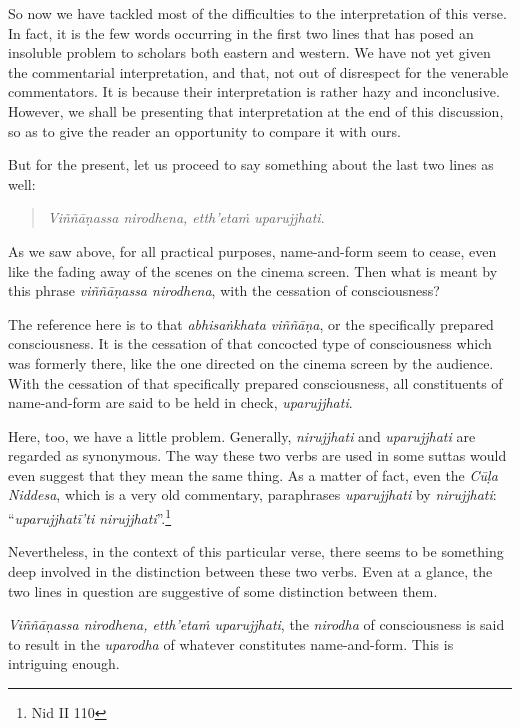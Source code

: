 So now we have tackled most of the difficulties to the interpretation of this verse. In fact, it is the few words occurring in the first two lines that has posed an insoluble problem to scholars both eastern and western. We have not yet given the commentarial interpretation, and that, not out of disrespect for the venerable commentators. It is because their interpretation is rather hazy and inconclusive. However, we shall be presenting that interpretation at the end of this discussion, so as to give the reader an opportunity to compare it with ours.

But for the present, let us proceed to say something about the last two lines as well:

\begin{quote}
\emph{Viññāṇassa nirodhena, etth'etaṁ uparujjhati}.
\end{quote}

As we saw above, for all practical purposes, name-and-form seem to cease, even like the fading away of the scenes on the cinema screen. Then what is meant by this phrase \emph{viññāṇassa nirodhena}, with the cessation of consciousness?

The reference here is to that \emph{abhisaṅkhata viññāṇa}, or the specifically prepared consciousness. It is the cessation of that concocted type of consciousness which was formerly there, like the one directed on the cinema screen by the audience. With the cessation of that specifically prepared consciousness, all constituents of name-and-form are said to be held in check, \emph{uparujjhati}.

Here, too, we have a little problem. Generally, \emph{nirujjhati} and \emph{uparujjhati} are regarded as synonymous. The way these two verbs are used in some suttas would even suggest that they mean the same thing. As a matter of fact, even the \emph{Cūḷa Niddesa}, which is a very old commentary, paraphrases \emph{uparujjhati} by \emph{nirujjhati}: ``\emph{uparujjhatī'ti nirujjhati}''.\footnote{Nid II 110}

Nevertheless, in the context of this particular verse, there seems to be something deep involved in the distinction between these two verbs. Even at a glance, the two lines in question are suggestive of some distinction between them.

\emph{Viññāṇassa nirodhena, etth'etaṁ uparujjhati}, the \emph{nirodha} of consciousness is said to result in the \emph{uparodha} of whatever constitutes name-and-form. This is intriguing enough.

